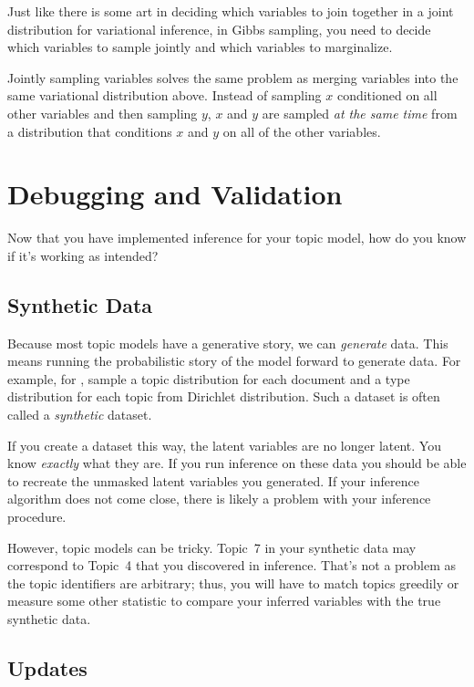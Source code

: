 Just like there is some art in deciding which variables to join
together in a joint distribution for variational inference, in Gibbs
sampling, you need to decide which variables to sample jointly and
which variables to marginalize.

Jointly sampling variables solves the same problem as merging
variables into the same variational distribution above.  Instead of
sampling $x$ conditioned on all other variables and then sampling $y$,
$x$ and $y$ are sampled \emph{at the same time} from a distribution
that conditions $x$ and $y$ on all of the other variables.

\section{Debugging and Validation}

Now that you have implemented inference for your topic model, how do
you know if it's working as intended?

\subsection{Synthetic Data}

Because most topic models have a generative story, we can
\emph{generate} data.  This means running the probabilistic story of
the model forward to generate data.  For example, for ,
sample a topic distribution for each document and a type distribution
for each topic from Dirichlet distribution.  Such a dataset is often
called a \emph{synthetic} dataset.

If you create a dataset this way, the latent variables are no longer
latent.  You know \emph{exactly} what they are.  If you run inference
on these data you should be able to recreate the unmasked latent
variables you generated.  If your inference algorithm does not come
close, there is likely a problem with your inference procedure.

However, topic models can be tricky.  Topic~7 in your synthetic data
may correspond to Topic~4 that you discovered in inference.  That's
not a problem as the topic identifiers are arbitrary; thus, you will
have to match topics greedily or measure some other statistic to
compare your inferred variables with the true synthetic data.

\subsection{Updates}

